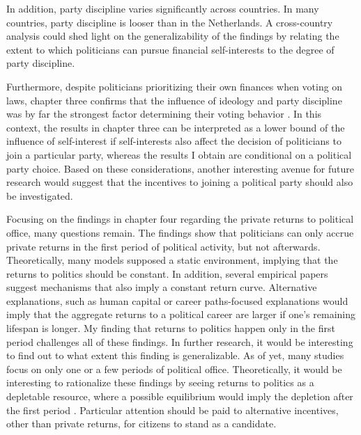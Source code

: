 In addition, party discipline varies significantly across countries. In many countries, party discipline is looser than in the Netherlands. A cross-country analysis could shed light on the generalizability of the findings by relating the extent to which politicians can pursue financial self-interests to the degree of party discipline. 

Furthermore, despite politicians prioritizing their own finances when voting on laws, chapter three confirms that the influence of ideology and party discipline was by far the strongest factor determining their voting behavior \citep[see e.g.][]{de2003het, de2014ons}. In this context, the results in chapter three can be interpreted as a lower bound of the influence of self-interest if self-interests also affect the decision of politicians to join a particular party, whereas the results I obtain are conditional on a political party choice. Based on these considerations, another interesting avenue for future research would suggest that the incentives to joining a political party should also be investigated.

Focusing on the findings in chapter four regarding the private returns to political office, many questions remain. The findings show that politicians can only accrue private returns in the first period of political activity, but not afterwards. Theoretically, many models supposed a static environment, implying that the returns to politics should be constant. In addition, several empirical papers \citep{baltrunaite2020political, bourveau2021political} suggest mechanisms that also imply a constant return curve. Alternative explanations, such as human capital or career paths-focused explanations \citep{eggers2009mps} would imply that the aggregate returns to a political career are larger if one's remaining lifespan is longer. My finding that returns to politics happen only in the first period challenges all of these findings. In further research, it would be interesting to find out to what extent this finding is generalizable. As of yet, many studies focus on only one or a few periods of political office. Theoretically, it would be interesting to rationalize these findings by seeing returns to politics as a depletable resource, where a possible equilibrium would imply the depletion after the first period \citep[cf.][, p. 74]{acemoglu2013political}. Particular attention should be paid to alternative incentives, other than private returns, for citizens to stand as a candidate. 

